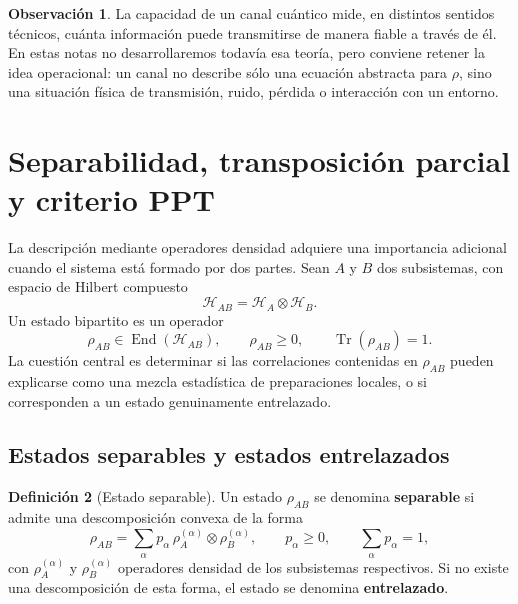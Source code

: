 \documentclass[12pt,a4paper]{article}
\theoremstyle{definition}
\newtheorem{definicion}{Definición}[section]
\newtheorem{observacion}[definicion]{Observación}
\theoremstyle{plain}
\theoremstyle{remark}
\newcommand{\Hil}{\mathcal{H}}
\newcommand{\TrA}{\operatorname{Tr}}
\begin{document}
\begin{observacion}
La capacidad de un canal cuántico mide, en distintos sentidos técnicos, cuánta información puede transmitirse de manera fiable a través de él. En estas notas no desarrollaremos todavía esa teoría, pero conviene retener la idea operacional: un canal no describe sólo una ecuación abstracta para $\rho$, sino una situación física de transmisión, ruido, pérdida o interacción con un entorno.
\end{observacion}

\newpage

\section{Separabilidad, transposición parcial y criterio PPT}\label{sec:separabilidad-ppt}

La descripción mediante operadores densidad adquiere una importancia adicional cuando el sistema está formado por dos partes. Sean $A$ y $B$ dos subsistemas, con espacio de Hilbert compuesto
\begin{equation*}
    \Hil_{AB}=\Hil_A\otimes\Hil_B.
\end{equation*}
Un estado bipartito es un operador
\begin{equation*}
    \rho_{AB}\in \operatorname{End}(\Hil_{AB}),
    \qquad
    \rho_{AB}\geq 0,
    \qquad
    \TrA(\rho_{AB})=1.
\end{equation*}
La cuestión central es determinar si las correlaciones contenidas en $\rho_{AB}$ pueden explicarse como una mezcla estadística de preparaciones locales, o si corresponden a un estado genuinamente entrelazado.

\subsection{Estados separables y estados entrelazados}

\begin{definicion}[Estado separable]
Un estado $\rho_{AB}$ se denomina \textbf{separable} si admite una descomposición convexa de la forma
\begin{equation*}
    \rho_{AB}
    =\sum_{\alpha} p_{\alpha}\,
    \rho_A^{(\alpha)}\otimes\rho_B^{(\alpha)},
    \qquad
    p_{\alpha}\geq 0,
    \qquad
    \sum_{\alpha}p_{\alpha}=1,
\end{equation*}
con $\rho_A^{(\alpha)}$ y $\rho_B^{(\alpha)}$ operadores densidad de los subsistemas respectivos. Si no existe una descomposición de esta forma, el estado se denomina \textbf{entrelazado}.
\end{definicion}
\end{document}
